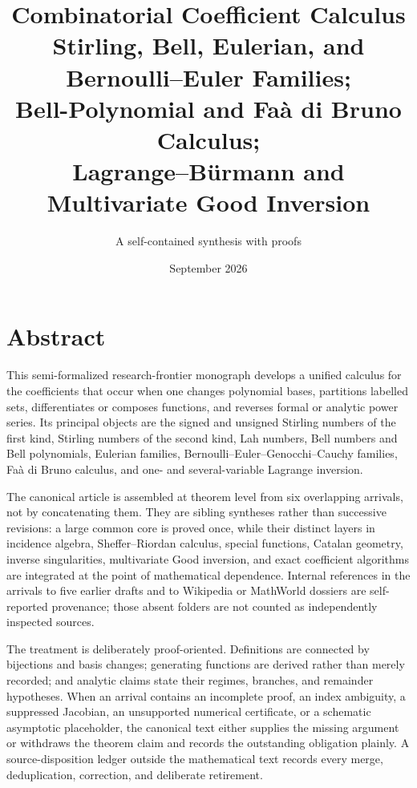 \documentclass[11pt,a4paper,oneside,openany]{book}
\title{\Huge\bfseries Combinatorial Coefficient Calculus\\[3mm]
\Large Stirling, Bell, Eulerian, and Bernoulli--Euler Families;\\
Bell-Polynomial and Fa\`a di Bruno Calculus;\\
Lagrange--B\"urmann and Multivariate Good Inversion}
\author{A self-contained synthesis with proofs}
\date{September 2026}
\theoremstyle{definition}
\theoremstyle{remark}
\begin{document}
\frontmatter
\hypersetup{pageanchor=false}
\maketitle
\hypersetup{pageanchor=true}

\chapter*{Abstract}
This semi-formalized research-frontier monograph develops a unified calculus for
the coefficients that occur when one changes polynomial bases, partitions labelled
sets, differentiates or composes functions, and reverses formal or analytic power
series.  Its principal objects are the signed and unsigned Stirling numbers of the
first kind, Stirling numbers of the second kind, Lah numbers, Bell numbers and Bell
polynomials, Eulerian families, Bernoulli--Euler--Genocchi--Cauchy families,
Fa\`a di Bruno calculus, and one- and several-variable Lagrange inversion.

The canonical article is assembled at theorem level from six overlapping arrivals,
not by concatenating them.  They are sibling syntheses rather than successive
revisions: a large common core is proved once, while their distinct layers in
incidence algebra, Sheffer--Riordan calculus, special functions, Catalan geometry,
inverse singularities, multivariate Good inversion, and exact coefficient algorithms
are integrated at the point of mathematical dependence.  Internal references in
the arrivals to five earlier drafts and to Wikipedia or MathWorld dossiers are
self-reported provenance; those absent folders are not counted as independently
inspected sources.

The treatment is deliberately proof-oriented.  Definitions are connected by
bijections and basis changes; generating functions are derived rather than merely
recorded; and analytic claims state their regimes, branches, and remainder
hypotheses.  When an arrival contains an incomplete proof, an index ambiguity, a
suppressed Jacobian, an unsupported numerical certificate, or a schematic
asymptotic placeholder, the canonical text either supplies the missing argument or
withdraws the theorem claim and records the outstanding obligation plainly.  A
source-disposition ledger outside the mathematical text records every merge,
deduplication, correction, and deliberate retirement.
\end{document}

